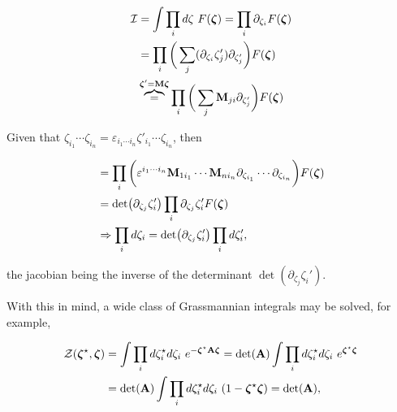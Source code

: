 \documentclass{homework}
\begin{document}
\begin{itemize}
\begin{tcolorbox}[colback=yellow!10!white,colframe=red!75!black,lowerbox=invisible, title = Transformation of Grassmann variables ]
\begin{equation}
    \begin{split}
        \mathcal{I} &= \int \prod_{i} d\zeta \textnormal{ } F(\bm{\zeta}) = \prod_{i} \partial_{\zeta_i} F(\bm{\zeta}) \\
        &= \prod_{i} \bigg(\sum_{j} (\partial_{\zeta_i} \zeta_j') \partial_{\zeta_j'}\bigg) F(\bm{\zeta})\\
        & \overbrace{=}^{\bm{\zeta}' = {\bf M} \bm{\zeta}} \prod_{i} \bigg(\sum_{j} {{\bf M}}_{ji} \partial_{\zeta_j'}\bigg) F(\bm{\zeta})\\
     \end{split} 
\end{equation}

Given that $\zeta_{i_1} \cdots \zeta_{i_n} = \varepsilon_{i_1 \cdots i_n} \zeta'_{i_1} \cdots \zeta_{i_n} $, then

\begin{equation}
    \begin{split}
        &= \prod_{i} \bigg(\varepsilon^{i_1 \cdots i_n} {{\bf M}}_{1i_1} \cdots  {{\bf M}}_{ni_n} \partial_{\zeta_{ i_1}} \cdots \partial_{\zeta_{i_n}} \bigg) F(\bm{\zeta}) \\
        &= \det(\partial_{\zeta_j} \zeta_i') \prod_{i} \partial_{\zeta_j} \zeta_i' F(\bm{\zeta}) \\
        &\Rightarrow \prod_{i} d\zeta_i = \det(\partial_{\zeta_j} \zeta_i') \prod_{i} d{\zeta_i'},
    \end{split}
\end{equation}

the jacobian being the inverse of the determinant $\det(\partial_{\zeta_j} \zeta_i')$.
\end{tcolorbox}

With this in mind, a wide class of Grassmannian integrals may be solved, for example, 

\begin{equation}
\begin{split}
    \mathcal{Z}(\bm{\zeta}^\star,\bm{\zeta}) &= \int \prod_{i} d{\zeta}_i^\star d{\zeta}_i \textnormal{ } e^{- \bm{\zeta}^\star {\bf A} \bm{\zeta}} = \det (\bf A) \int \prod_{i} d{\zeta}_i^\star d{\zeta}_i \textnormal{ } e^{\bm{\zeta}^\star \bm{\zeta}} \\
    &= \det (\bf A) \int \prod_{i} d{\zeta}_i^\star d{\zeta}_i \textnormal{ } (1 - {\bm{\zeta}^\star \bm{\zeta}}) = \det (\bf A),
\end{split}
\end{equation}
\end{itemize}
\end{document}
